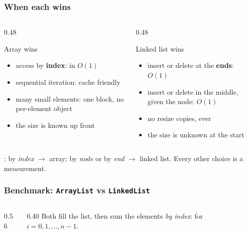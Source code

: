 \documentclass[aspectratio=169,10pt,compress]{beamer}
\begin{document}
\begin{frame}[t,fragile] \frametitle{When each wins}
  \begin{columns}[T]
    \begin{column}{0.48\textwidth}
      \begin{block}{Array wins}
        \small
        \begin{itemize}
          \item access by \textbf{index}:  in $O(1)$
          \item sequential iteration: cache friendly
          \item many small elements: one block, no per-element object
          \item the size is known up front
        \end{itemize}
      \end{block}
    \end{column}
    \begin{column}{0.48\textwidth}
      \begin{block}{Linked list wins}
        \small
        \begin{itemize}
          \item insert or delete at the \textbf{ends}: $O(1)$
          \item insert or delete in the middle, given the node: $O(1)$
          \item no resize copies, ever
          \item the size is unknown at the start
        \end{itemize}
      \end{block}
    \end{column}
  \end{columns}
  \vspace{0.5em}
  \small
  : by \emph{index} $\to$ array; by
  \emph{node} or by \emph{end} $\to$ linked list. Every other choice is
  a measurement.
\end{frame}




\begin{frame}[t,fragile] \frametitle{Benchmark: \texttt{ArrayList} vs \texttt{LinkedList}}
  \begin{columns}[T]
    \begin{column}{0.56\textwidth}
    \end{column}
    \begin{column}{0.40\textwidth}
      \small
      Both fill the list, then sum the elements \emph{by index}:
       for $i = 0, 1, \dots, n-1$.
    \end{column}
  \end{columns}
  \vspace{0.3em}
\end{frame}
\end{document}
